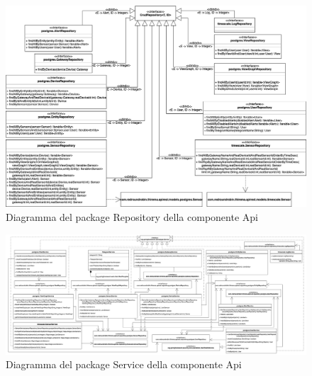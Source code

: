 		\begin{landscape}
		\begin{figure}[H]
			\centering
			\includegraphics[scale=0.550]{res/images/API/RepositoryPackage.png}
			\caption{Diagramma del package Repository della componente Api}
		\end{figure}
		\begin{figure}[H]
			\centering
			\includegraphics[scale=0.300]{res/images/API/ServicePackage.png}
			\caption{Diagramma del package Service della componente Api}
		\end{figure}
		

\end{landscape}
